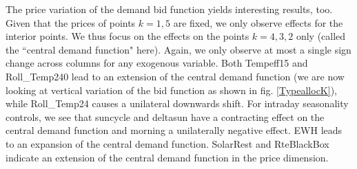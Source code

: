 The price variation of the demand bid function yields interesting results, too. Given that the prices of points $k=1,5$ are fixed, we only observe effects for the interior points. We thus focus on the effects on the points $k=4,3,2$ only (called the ``central demand function" here). %
Again, we only observe at most a single sign change across columns for any exogenous variable. 
Both Tempeff15 and Roll\_Temp240 lead to an extension of the central demand function (we are now looking at vertical variation of the bid function as shown in fig. \ref{TypeallocK}), while Roll\_Temp24 causes a  unilateral downwards shift. 
For intraday seasonality controls, we see that suncycle and deltasun have a contracting effect on the central demand function and morning a unilaterally negative effect. EWH leads to an expansion of the central demand function. 
SolarRest and RteBlackBox indicate an extension of the central demand function in the price dimension. 

%
%

